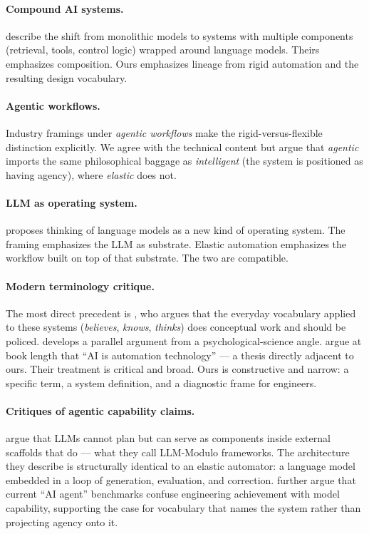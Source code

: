 \documentclass[11pt,a4paper]{article}
\begin{document}
\paragraph{Compound AI systems.} \citet{zaharia2024compound} describe the shift from monolithic models to systems with multiple components (retrieval, tools, control logic) wrapped around language models. Theirs emphasizes composition. Ours emphasizes lineage from rigid automation and the resulting design vocabulary.

\paragraph{Agentic workflows.} Industry framings under \textit{agentic workflows} \citep{ibm2026agentic} make the rigid-versus-flexible distinction explicitly. We agree with the technical content but argue that \textit{agentic} imports the same philosophical baggage as \textit{intelligent} (the system is positioned as having agency), where \textit{elastic} does not.

\paragraph{LLM as operating system.} \citet{karpathy2023llms} proposes thinking of language models as a new kind of operating system. The framing emphasizes the LLM as substrate. Elastic automation emphasizes the workflow built on top of that substrate. The two are compatible.

\paragraph{Modern terminology critique.} The most direct precedent is \citet{shanahan2024talking}, who argues that the everyday vocabulary applied to these systems (\textit{believes}, \textit{knows}, \textit{thinks}) does conceptual work and should be policed. \citet{bender2024dehumanization} develops a parallel argument from a psychological-science angle. \citet{benderhanna2025aicon} argue at book length that ``AI is automation technology'' --- a thesis directly adjacent to ours. Their treatment is critical and broad. Ours is constructive and narrow: a specific term, a system definition, and a diagnostic frame for engineers.

\paragraph{Critiques of agentic capability claims.} \citet{kambhampati2024llmmodulo} argue that LLMs cannot plan but can serve as components inside external scaffolds that do --- what they call LLM-Modulo frameworks. The architecture they describe is structurally identical to an elastic automator: a language model embedded in a loop of generation, evaluation, and correction. \citet{kapoor2024agents} further argue that current ``AI agent'' benchmarks confuse engineering achievement with model capability, supporting the case for vocabulary that names the system rather than projecting agency onto it.
\end{document}
